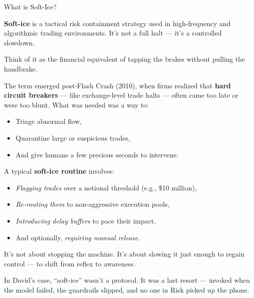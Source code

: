 \begin{HistoricalSidebar}{What is Soft-Ice?}

  \textbf{Soft-ice} is a tactical risk containment strategy used in high-frequency and algorithmic trading 
  environments. It’s not a full halt — it’s a controlled slowdown.
  
  \medskip
  
  Think of it as the financial equivalent of tapping the brakes without pulling the handbrake.
  
  \medskip
  
  The term emerged post-Flash Crash (2010), when firms realized that \textbf{hard circuit breakers} — like 
  exchange-level trade halts — often came too late or were too blunt. What was needed was a way to:

  \medskip

  \begin{itemize}
    \item Triage abnormal flow,
    \item Quarantine large or suspicious trades,
    \item And give humans a few precious seconds to intervene.
  \end{itemize}
  
  \medskip
  
  A typical \textbf{soft-ice routine} involves:

  \medskip

  \begin{itemize}
    \item \textit{Flagging trades} over a notional threshold (e.g., \$10 million),
    \item \textit{Re-routing them} to non-aggressive execution pools,
    \item \textit{Introducing delay buffers} to pace their impact,
    \item And optionally, \textit{requiring manual release}.
  \end{itemize}
  
  \medskip
  
  It’s not about stopping the machine. It’s about slowing it just enough to regain control — to shift from 
  reflex to awareness.
  
  \medskip
  
  In David’s case, “soft-ice” wasn’t a protocol. It was a last resort — invoked when the model failed, the 
  guardrails slipped, and no one in Risk picked up the phone.
  
\end{HistoricalSidebar}

